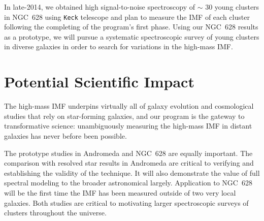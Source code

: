 \documentclass[11pt,preprint]{aastex}
\begin{document}
In late-2014, we obtained high signal-to-noise spectroscopy of $\sim$ 30 young clusters in NGC~628 using \texttt{Keck} telescope and plan to measure the IMF of each cluster following the completing of the program's first phase.  Using our NGC~628 results as a prototype, we will pursue a systematic spectroscopic survey of young clusters in diverse galaxies in order to search for variations in the high-mass IMF.

%


\section{Potential Scientific Impact}

The high-mass IMF underpins virtually all of galaxy evolution and cosmological studies that rely on star-forming galaxies, and our program is the gateway to transformative science: unambiguously measuring the high-mass IMF in distant galaxies has never before been possible.

The prototype studies in Andromeda and NGC~628 are equally important. The comparison with resolved star results in Andromeda are critical to verifying and establishing the validity of the technique.  It will also demonstrate the value of full spectral modeling to the broader astronomical largely.  Application to NGC~628 will be the first time the IMF has been measured outside of two very local galaxies. Both studies are critical to motivating larger spectroscopic surveys of clusters throughout the universe.
\end{document}
